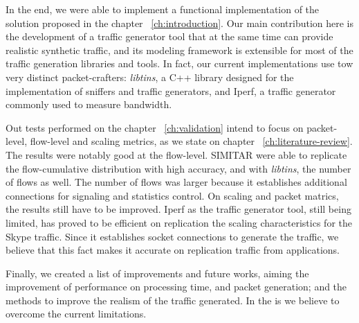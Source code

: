 In the end, we were able to implement a functional implementation of the solution proposed in the chapter ~\ref{ch:introduction}. Our main contribution here is the development of a traffic generator tool that at the same time can provide realistic synthetic traffic, and its modeling framework is extensible for most of the traffic generation libraries and tools. In fact, our current implementations use tow very distinct packet-crafters: \textit{libtins}, a C++ library designed for the implementation of sniffers and traffic generators, and Iperf, a traffic generator commonly used to measure bandwidth. 


Out tests performed on the chapter ~\ref{ch:validation} intend to focus on packet-level, flow-level and scaling metrics, as we state on chapter ~\ref{ch:literature-review}. The results were notably good at the flow-level. SIMITAR were able to replicate the flow-cumulative distribution with high accuracy, and with \textit{libtins}, the number of flows as well. The number of flows was larger because it establishes additional connections for signaling and statistics control. On scaling and packet matrics, the results still have to be improved. Iperf as the traffic generator tool, still being limited, has proved to be efficient on replication the scaling characteristics for the Skype traffic. Since it establishes socket connections to generate the traffic, we believe that this fact makes it accurate on replication traffic from applications. 


Finally, we created a list of improvements and future works, aiming the improvement of performance on processing time, and packet generation; and the methods to improve the realism of the traffic generated. In the is we believe to overcome the current limitations.



